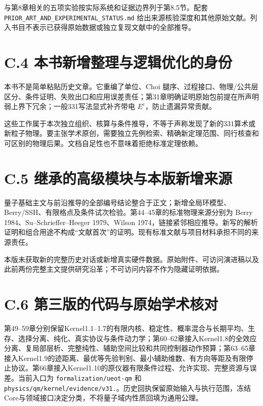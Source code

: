 \documentclass[
  11pt,
  oneside]{book}
\begin{document}
与第8章相关的五项实验按实际系统和证据边界列于第8.5节。配套
\texttt{PRIOR\_\allowbreak ART\_\allowbreak AND\_\allowbreak EXPERIMENTAL\_\allowbreak STATUS.\allowbreak md}
给出来源核验深度和其他原始文献。列入书目不表示已获得原始数据或独立复现文献中的全部推导。

\section{C.4 本书新增整理与逻辑优化的身份}

本书不是简单粘贴历史文章。它重编了单位、Choi
腿序、过程接口、物理/公共层区分、条件证明、失败出口和应用误差责任；第31章明确证明原始包前提在所声明弱上界下冗余；一般331写法显式补齐带电
\(E^c\)，防止遗漏异常贡献。

这些工作属于本次独立组织、核算与条件推导，不等于声称发现了新的331算术或新粒子物理。要主张学术原创，需要独立先例检索、精确新定理范围、同行核查和可区别的物理后果。文档自足性也不意味着拒绝标准定理依赖。

\section{C.5 继承的高级模块与本版新增来源}

量子基础主文与前沿推导的全部编号结论整合于正文；新增全局环模型、Berry/SSH、有限格点及条件试次检验。第44--45章的标准物理来源分别为
Berry 1984、Su--Schrieffer--Heeger 1979、Wilson
1974，链接紧邻相应推导。新写的解析证明和组合用途不构成``文献首次''的证明。现有标准文献与项目材料承担不同的来源责任。

本版未获取新的完整历史对话或新增真实硬件数据。原始附件、可访问演进稿以及此前两份完整主文提供研究沿革；不可访问内容不作为隐藏证明依据。

\section{C.6 第三版的代码与原始学术核对}

第49--59章分别保留Kernel1.1--1.7的有限内核、稳定性、概率混合与长期平均、生存、选择分离、纯化、真实协议与条件动力学；第60--62章接入Kernel1.8的全效应分离、复局部层析、完整纯性、辅助空间比较和共同控制器动作预算；第63--65章接入Kernel1.9的迹距离、最优等先验判别、最小辅助维数、有方向等距及有限停止协议。第66章接入Kernel1.10的原仪器有限条件过程、允许实现、完整资源与误差。当前入口为
\texttt{formalization/\allowbreak ueot-\allowbreak qm} 和
\texttt{physics/\allowbreak qm/\allowbreak kernel/\allowbreak evidence/\allowbreak v31.}。历史回执保留原始输入与执行范围，冻结Core与领域接口决定分类，不将量子域内性质回填为通用公理。
\end{document}
